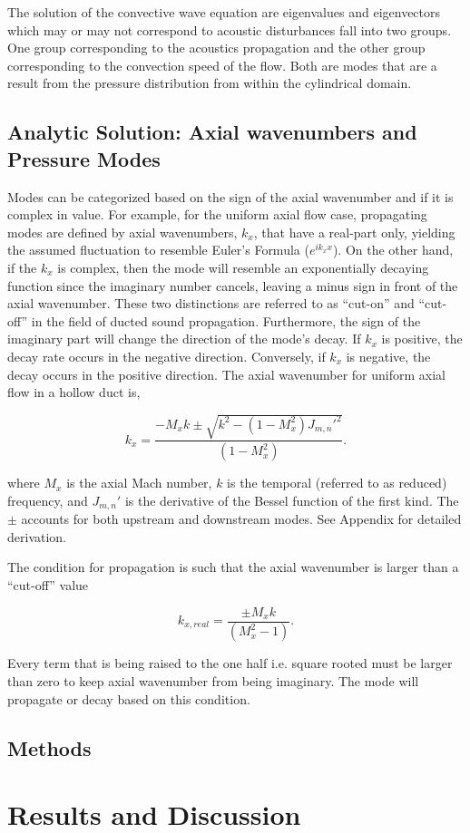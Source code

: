 \documentclass[a4paper]{report}
\begin{document}
The solution of the convective wave equation are eigenvalues and eigenvectors 
which may or may not correspond to acoustic disturbances fall into two groups.  
One group corresponding to the acoustics propagation and the other group 
corresponding to the convection speed of the flow. Both are modes that are a
result from the pressure distribution from within the cylindrical domain.  

% 
\subsection{ Analytic Solution: Axial wavenumbers and Pressure Modes}

Modes can be categorized based on the sign of the axial wavenumber and if it is
complex in value. For example, for the uniform axial flow case, propagating modes
are defined by axial wavenumbers, $k_x$, that have a real-part only, yielding 
the assumed fluctuation to resemble Euler's Formula ($e^{ik_x x}$). On the other 
hand, if the $k_x$ is complex, then the mode will resemble an exponentially decaying
function since the imaginary number cancels, leaving a minus sign in front of
the axial wavenumber. These two distinctions are referred to as ``cut-on'' and 
``cut-off'' in the field of ducted sound propagation. Furthermore, the sign of 
the imaginary part will change the direction of the mode's decay. If $k_x$ is 
positive, the decay rate occurs in the negative direction. Conversely, if $k_x$ 
is negative, the decay occurs in the positive direction. The axial wavenumber
for uniform axial flow in a hollow duct is,

\begin{equation}
    k_x  = \frac{- M_x k \pm \sqrt{k^2 - ( 1 - M_x^2) J_{m,n}'^2 }}{\left( 1 - M_x^2 \right)}.
    \label{eqn:ax_wavenumb}
\end{equation}

where $M_x$ is the axial Mach number, $k$ is the temporal (referred to as reduced)
frequency, and $J_{m,n}'$ is the derivative of the Bessel function of the first kind.  
The $\pm$ accounts for both upstream and downstream modes. See Appendix for detailed
derivation.

The condition for propagation is such that the axial wavenumber is larger than 
a ``cut-off'' value

\begin{equation}
    k_{x,real}  = \frac{\pm M_x k }{\left( M_x^2 - 1 \right)}.
    \label{eqn:cuton}
\end{equation}

Every term that is being raised to the one half i.e. square rooted must 
be larger than zero to keep axial wavenumber from being imaginary. The mode 
will propagate or decay based on this condition. 

\subsection{Methods}
% 
\section{Results and Discussion}


\end{document}
